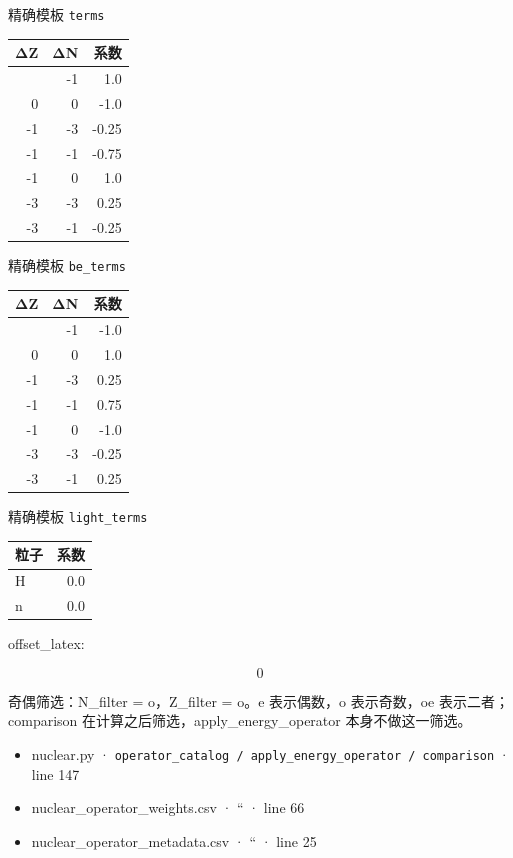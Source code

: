 \documentclass[
  11pt,
  letterpaper,
]{article}
\providecommand{\tightlist}{%
  \setlength{\itemsep}{0pt}\setlength{\parskip}{0pt}}
\begin{document}
精确模板 \texttt{terms}

\begin{longtable}[]{@{}rrr@{}}
\toprule\noalign{}
ΔZ & ΔN & 系数 \\
\midrule\noalign{}
\endhead
\bottomrule\noalign{}
\endlastfoot
0 & -1 & 1.0 \\
0 & 0 & -1.0 \\
-1 & -3 & -0.25 \\
-1 & -1 & -0.75 \\
-1 & 0 & 1.0 \\
-3 & -3 & 0.25 \\
-3 & -1 & -0.25 \\
\end{longtable}

精确模板 \texttt{be\_terms}

\begin{longtable}[]{@{}rrr@{}}
\toprule\noalign{}
ΔZ & ΔN & 系数 \\
\midrule\noalign{}
\endhead
\bottomrule\noalign{}
\endlastfoot
0 & -1 & -1.0 \\
0 & 0 & 1.0 \\
-1 & -3 & 0.25 \\
-1 & -1 & 0.75 \\
-1 & 0 & -1.0 \\
-3 & -3 & -0.25 \\
-3 & -1 & 0.25 \\
\end{longtable}

精确模板 \texttt{light\_terms}

\begin{longtable}[]{@{}lr@{}}
\toprule\noalign{}
粒子 & 系数 \\
\midrule\noalign{}
\endhead
\bottomrule\noalign{}
\endlastfoot
H & 0.0 \\
n & 0.0 \\
\end{longtable}

offset\_latex:

\[
0
\]

奇偶筛选：N\_filter = o，Z\_filter = o。e 表示偶数，o 表示奇数，oe
表示二者；comparison 在计算之后筛选，apply\_energy\_operator
本身不做这一筛选。

\begin{itemize}
\tightlist
\item
  nuclear.py ·
  \texttt{operator\_catalog\ /\ apply\_energy\_operator\ /\ comparison}
  · line 147
\item
  nuclear\_operator\_weights.csv · `` · line 66
\item
  nuclear\_operator\_metadata.csv · `` · line 25
\end{itemize}
\end{document}

